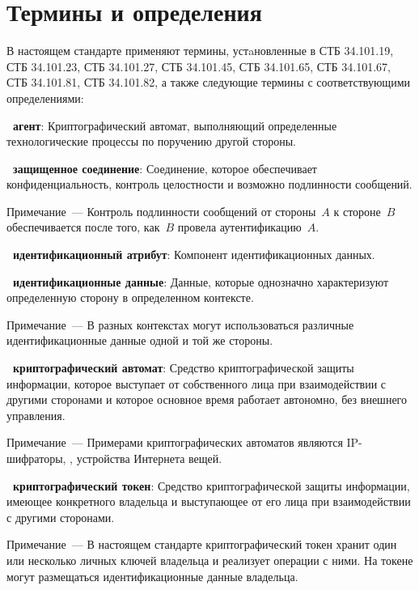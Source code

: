 \chapter{Термины и определения}

В настоящем стандарте применяют термины, устaновленные в СТБ 34.101.19,
СТБ 34.101.23, СТБ 34.101.27, СТБ 34.101.45, СТБ 34.101.65, 
СТБ 34.101.67, СТБ 34.101.81, СТБ 34.101.82, а также следующие термины с 
соответствующими определениями:

{\bf \thedefctr~агент}:
Криптографический автомат, выполняющий определенные технологические 
процессы по поручению другой стороны.

{\bf \thedefctr~защищенное соединение}:
Соединение, которое обеспечивает конфиденциальность, 
контроль целостности и возможно подлинности сообщений. 

\begin{note}
Примечание~--- Контроль подлинности сообщений от стороны~$A$ к стороне~$B$ 
обеспечивается после того, как~$B$ провела аутентификацию~$A$.
\end{note}

{\bf \thedefctr~идентификационный атрибут}:
Компонент идентификационных данных. 

{\bf \thedefctr~идентификационные данные}:
Данные, которые однозначно характеризуют определенную 
сторону в определенном контексте. 

\begin{note}
Примечание~--- В разных контекстах могут использоваться 
различные идентификационные данные одной и той же стороны.
\end{note}

{\bf\thedefctr~криптографический автомат}: 
Средство криптографической защиты информации, которое выступает от 
собственного лица при взаимодействии с другими сторонами
и которое основное время работает автономно, без внешнего управления.

\begin{note}
Примечание~--- 
Примерами криптографических автоматов являются IP-шифраторы, 
, устройства Интернета вещей.
\end{note}

{\bf\thedefctr~криптографический токен}: 
Средство криптографической защиты информации, имеющее конкретного 
владельца и выступающее от его лица при взаимодействии с другими 
сторонами. 
%
\begin{note}
Примечание~--- В настоящем стандарте криптографический токен хранит один 
или несколько личных ключей владельца и реализует операции с ними.  
%
На токене могут размещаться идентификационные данные владельца. 
\end{note}

